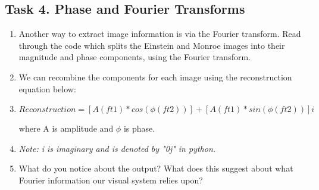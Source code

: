 \documentclass[12pt,english]{scrartcl}
\begin{document}
\subsection*{Task 4. Phase and Fourier Transforms}
\begin{enumerate}
\item Another way to extract image information is via the Fourier transform. Read through the code which splits the Einstein and Monroe images into their magnitude and phase components, using the Fourier transform. 
\item We can recombine the components for each image using the reconstruction equation below:
\item[] 
$Reconstruction = [A(ft1)*cos(\phi(ft2))] + [A(ft1)*sin(\phi(ft2))] i$ \\
\bigskip
\raggedright where A is amplitude and $\phi$ is phase.
\item[] {\it Note: i is imaginary and is denoted by "0j" in python.}
\item What do you notice about the output? What does this suggest about what Fourier information our visual system relies upon?
\end{enumerate}
\end{document}
